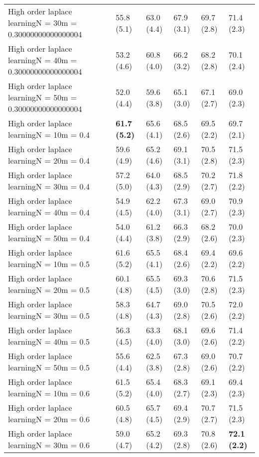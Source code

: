 \documentclass{article}
\begin{document}
\begin{table*}[t!]
\begin{center}
\begin{small}
\begin{sc}
\begin{tabular}{llllll}
High order laplace learningN = 30m = 0.30000000000000004&55.8 (5.1)      &63.0 (4.4)      &67.9 (3.1)      &69.7 (2.8)      &71.4 (2.3)      \\
High order laplace learningN = 40m = 0.30000000000000004&53.2 (4.6)      &60.8 (4.0)      &66.2 (3.2)      &68.2 (2.8)      &70.1 (2.4)      \\
High order laplace learningN = 50m = 0.30000000000000004&52.0 (4.4)      &59.6 (3.8)      &65.1 (3.0)      &67.1 (2.7)      &69.0 (2.3)      \\
High order laplace learningN = 10m = 0.4&{\bf 61.7 (5.2)}&65.6 (4.1)      &68.5 (2.6)      &69.5 (2.2)      &69.7 (2.1)      \\
High order laplace learningN = 20m = 0.4&59.6 (4.9)      &65.2 (4.6)      &69.1 (3.1)      &70.5 (2.8)      &71.5 (2.3)      \\
High order laplace learningN = 30m = 0.4&57.2 (5.0)      &64.0 (4.3)      &68.5 (2.9)      &70.2 (2.7)      &71.8 (2.2)      \\
High order laplace learningN = 40m = 0.4&54.9 (4.5)      &62.2 (4.0)      &67.3 (3.1)      &69.0 (2.7)      &70.9 (2.3)      \\
High order laplace learningN = 50m = 0.4&54.0 (4.4)      &61.2 (3.8)      &66.3 (2.9)      &68.2 (2.6)      &70.0 (2.3)      \\
High order laplace learningN = 10m = 0.5&61.6 (5.2)      &65.5 (4.1)      &68.4 (2.6)      &69.4 (2.2)      &69.6 (2.2)      \\
High order laplace learningN = 20m = 0.5&60.1 (4.8)      &65.5 (4.5)      &69.3 (3.0)      &70.6 (2.8)      &71.5 (2.3)      \\
High order laplace learningN = 30m = 0.5&58.3 (4.8)      &64.7 (4.3)      &69.0 (2.8)      &70.5 (2.6)      &72.0 (2.2)      \\
High order laplace learningN = 40m = 0.5&56.3 (4.5)      &63.3 (4.0)      &68.1 (3.0)      &69.6 (2.6)      &71.4 (2.2)      \\
High order laplace learningN = 50m = 0.5&55.6 (4.4)      &62.5 (3.8)      &67.3 (2.8)      &69.0 (2.6)      &70.7 (2.2)      \\
High order laplace learningN = 10m = 0.6&61.5 (5.2)      &65.4 (4.0)      &68.3 (2.7)      &69.1 (2.3)      &69.4 (2.3)      \\
High order laplace learningN = 20m = 0.6&60.5 (4.8)      &65.7 (4.5)      &69.4 (2.9)      &70.7 (2.7)      &71.5 (2.3)      \\
High order laplace learningN = 30m = 0.6&59.0 (4.7)      &65.2 (4.2)      &69.3 (2.8)      &70.8 (2.6)      &{\bf 72.1 (2.2)}\\

\end{tabular}
\end{sc}
\end{small}
\end{center}
\end{table*}
\end{document}
